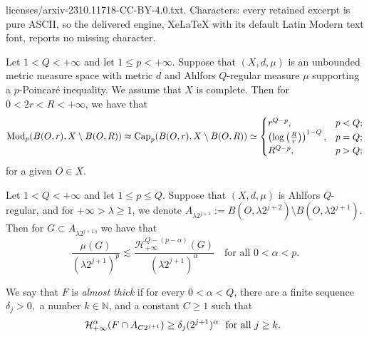 \documentclass[10pt,a4paper]{amsart}
\newcommand{\Ha}{\mathcal{H}}
\begin{document}
licenses/arxiv-2310.11718-CC-BY-4.0.txt. Characters: every retained excerpt is pure ASCII, so the delivered engine, XeLaTeX with its default Latin Modern text font, reports no missing character.
\begin{theorem}\label{thm2.1-0506}
Let  $1<Q<+\infty$ and let $1\le p<+\infty$.
Suppose that $(X,d,\mu)$ is an unbounded metric measure space with metric $d$ and Ahlfors $Q$-regular measure $\mu$ supporting a $p$-Poincar\'e inequality.
We assume that $X$ is complete. 
Then for $0<2r<R<+\infty$, we have that
\[
	\text{\rm Mod}_p(B(O,r), X\setminus B(O,R)) \approx \text{\rm Cap}_p(B(O,r), X\setminus B(O,R))\simeq
 \begin{cases}
     r^{Q-p},&p<Q;\\
     \left(\log \left(\frac{R}{r}\right)\right)^{1-Q},& p=Q;\\
     R^{Q-p},& p>Q;
 \end{cases}  
\]
for a given $O\in X$.
\end{theorem}

  \begin{lemma}\label{lem:Measure-Content Bound}
  Let $1<Q<+\infty$ and let $1\le p\le Q$.  Suppose that $(X,d,\mu)$ is Ahlfors $Q$-regular, and for $+\infty>\lambda\ge 1$, we denote $A_{\lambda 2^{j+1}}:=B(O,\lambda 2^{j+2})\setminus B(O,\lambda 2^{j+1})$.  Then for $G\subset A_{\lambda 2^{j+1}}$, we have that 
  \[
  \frac{\mu(G)}{(\lambda 2^{j+1})^p}\lesssim\frac{\Ha^{Q-(p-\alpha)}_{+\infty}(G)}{(\lambda 2^{j+1})^\alpha}\quad\text{for all }0<\alpha<p.
  \]      
  \end{lemma}

\begin{definition}\label{def:almost-thick}
 We say that $F$ is  {\it almost thick} if for every $0<\alpha<Q$, there are a finite sequence $\delta_j>0,$ a number $k\in\mathbb N$, and a constant $C\geq 1$ 
 such that 
 \begin{equation}
 \label{almost-thick}
 \mathcal H^{\alpha}_{+\infty} (F\cap A_{C2^{j+1}}) \geq \delta_j (2^{j+1})^\alpha \text{\rm \ \ for all $j\geq k$.
 }
 \end{equation}
\end{definition}
\end{document}
